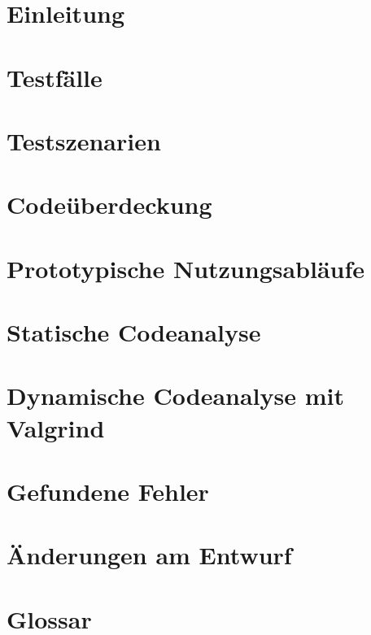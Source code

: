 

	
	\maketitle
	\setcounter{tocdepth}{1}
	\tableofcontents
	\chapter{Einleitung}
		
	\chapter{Testfälle}
		
	\chapter{Testszenarien}
		
	\chapter{Codeüberdeckung}
		
	\chapter{Prototypische Nutzungsabläufe}
		
	\chapter{Statische Codeanalyse}
		
	\chapter{Dynamische Codeanalyse mit Valgrind}
		
	\chapter{Gefundene Fehler}
		
	\chapter{Änderungen am Entwurf}
		
	\chapter{Glossar}
		
